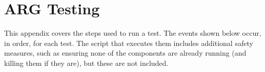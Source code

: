 \chapter{\ac{ARG} Testing}
\label{chp:testseq}
\par This appendix covers the steps used to run a test. The events shown below occur, in order, for each test. The script that executes them includes additional safety measures, such as ensuring none of the components are already running (and killing them if they are), but these are not included.

\begin{comment}
\section{Network Setup}
\par As Section \ref{sec:evaluation_technique} discusses, tests are run on a seven-node network, laid out as illustrated in Figure \ref{fig:argnetwork_app}.
\begin{figure}
	\centering
	\caption{ARG Network Layout Overview}
	\label{fig:argnetwork_app}
	\texttt{[image: thesis\_network]}
\end{figure}

\section{Test Sequence}
\end{comment}

